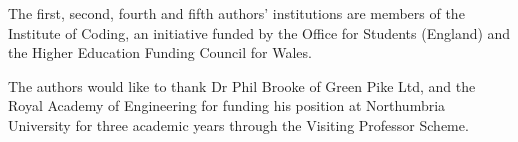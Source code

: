 \documentclass[conference]{IEEEtran}
\begin{document}
The first, second, fourth and fifth authors' institutions are members
of the Institute of Coding, an initiative funded by the Office for
Students (England) and the Higher Education Funding Council for Wales.

The authors would like to thank Dr Phil Brooke of Green Pike Ltd, and
the Royal Academy of Engineering for funding his position at
Northumbria University for three academic years through the Visiting
Professor Scheme.



%

\end{document}
